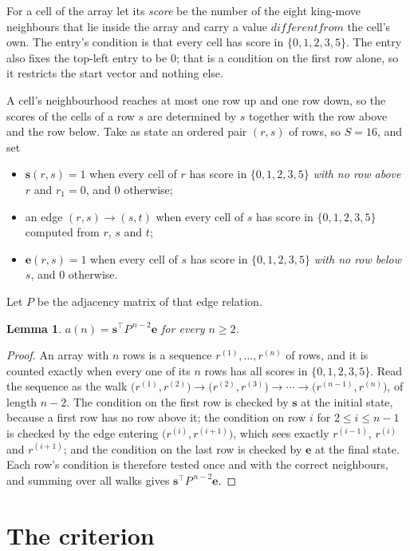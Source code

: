 \documentclass[11pt,a4paper]{article}
\theoremstyle{plain}
\newtheorem{lemma}[theorem]{Lemma}
\theoremstyle{definition}
\begin{document}
For a cell of the array let its \emph{score} be the number of the eight king-move neighbours that lie inside
the array and carry a value $different from$ the cell's own. The entry's condition is that every cell
has score in $\{0,1,2,3,5\}$. The entry also fixes the top-left entry to be $0$; that is a condition on the first row alone, so it restricts the start vector and nothing else.

A cell's neighbourhood reaches at most one row up and one row down, so the scores of the
cells of a row $s$ are determined by $s$ together with the row above and the row below.
Take as state an ordered pair $(r,s)$ of rows, so $S=16$, and set
\begin{itemize}
\item $\mathbf{s}(r,s)=1$ when every cell of $r$ has score in $\{0,1,2,3,5\}$ \emph{with no row
above $r$} and $r_1=0$, and $0$ otherwise;
\item an edge $(r,s)\to(s,t)$ when every cell of $s$ has score in $\{0,1,2,3,5\}$ computed from
$r$, $s$ and $t$;
\item $\mathbf{e}(r,s)=1$ when every cell of $s$ has score in $\{0,1,2,3,5\}$ \emph{with no row
below $s$}, and $0$ otherwise.
\end{itemize}
Let $P$ be the adjacency matrix of that edge relation.

\begin{lemma}\label{lem:walk}
$a(n)=\mathbf{s}^{\!\top}P^{\,n-2}\mathbf{e}$ for every $n\ge2$.
\end{lemma}

\begin{proof}
An array with $n$ rows is a sequence $r^{(1)},\dots,r^{(n)}$ of rows, and it is counted
exactly when every one of its $n$ rows has all scores in $\{0,1,2,3,5\}$. Read the sequence as the
walk $\bigl(r^{(1)},r^{(2)}\bigr)\to\bigl(r^{(2)},r^{(3)}\bigr)\to\cdots\to
\bigl(r^{(n-1)},r^{(n)}\bigr)$, of length $n-2$. The condition on the first row is
checked by $\mathbf{s}$ at the initial state, because a first row has no row above it; the
condition on row $i$ for $2\le i\le n-1$ is checked by the edge entering
$\bigl(r^{(i)},r^{(i+1)}\bigr)$, which sees exactly $r^{(i-1)}$, $r^{(i)}$ and
$r^{(i+1)}$; and the condition on the last row is checked by $\mathbf{e}$ at the final
state. Each row's condition is therefore tested once and with the correct neighbours, and
summing over all walks gives $\mathbf{s}^{\!\top}P^{\,n-2}\mathbf{e}$.
\end{proof}

\section{The criterion}
\end{document}
